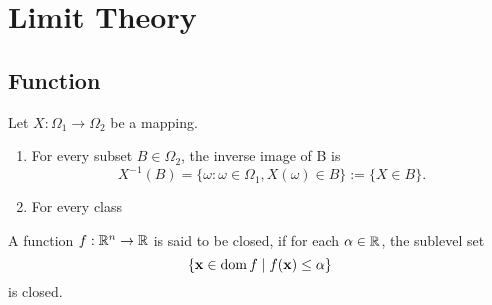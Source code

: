 \chapter{Limit Theory}

\section{Function}

\begin{definition}[Mapping]
	Let $X:\Omega_1\rightarrow\Omega_2$ be a mapping.
	\begin{enumerate}
		\item
		      For every subset $B\in\Omega_2$, the inverse image of B is
		      \begin{equation*}
			      X^{-1}(B)=\{\omega:\omega\in\Omega_1,X(\omega)\in B\}:=\{X\in B\}.
		      \end{equation*}
		\item
		      For every class
	\end{enumerate}
\end{definition}

\begin{definition} \label{def:closed-function}
	A function $f:{\mathbb R}^{n}\rightarrow{\mathbb R}$ is said to be closed, if for each $\alpha\in{\mathbb R}$, the sublevel set
	\begin{equation}
		\{{\bf x}\in\operatorname{dom}f\mid f({\bf x})\leq\alpha\}
	\end{equation}
	is closed.
\end{definition}
